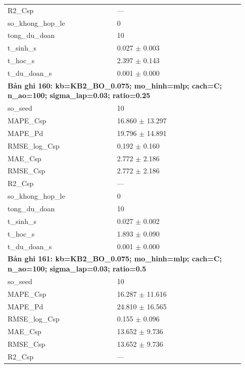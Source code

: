 \begin{longtable}{p{0.43\linewidth}p{0.50\linewidth}}
R2\_\allowbreak Csp & — \\
so\_\allowbreak khong\_\allowbreak hop\_\allowbreak le & 0 \\
tong\_\allowbreak du\_\allowbreak doan & 10 \\
t\_\allowbreak sinh\_\allowbreak s & 0.027 $\pm$ 0.003 \\
t\_\allowbreak hoc\_\allowbreak s & 2.397 $\pm$ 0.143 \\
t\_\allowbreak du\_\allowbreak doan\_\allowbreak s & 0.001 $\pm$ 0.000 \\
\midrule
\multicolumn{2}{p{0.95\linewidth}}{\textbf{Bản ghi 160: kb=KB2\_BO\_0.075; mo\_hinh=mlp; cach=C; n\_ao=100; sigma\_lap=0.03; ratio=0.25}} \\
so\_\allowbreak seed & 10 \\
MAPE\_\allowbreak Csp & 16.860 $\pm$ 13.297 \\
MAPE\_\allowbreak Pd & 19.796 $\pm$ 14.891 \\
RMSE\_\allowbreak log\_\allowbreak Csp & 0.192 $\pm$ 0.160 \\
MAE\_\allowbreak Csp & 2.772 $\pm$ 2.186 \\
RMSE\_\allowbreak Csp & 2.772 $\pm$ 2.186 \\
R2\_\allowbreak Csp & — \\
so\_\allowbreak khong\_\allowbreak hop\_\allowbreak le & 0 \\
tong\_\allowbreak du\_\allowbreak doan & 10 \\
t\_\allowbreak sinh\_\allowbreak s & 0.027 $\pm$ 0.002 \\
t\_\allowbreak hoc\_\allowbreak s & 1.893 $\pm$ 0.090 \\
t\_\allowbreak du\_\allowbreak doan\_\allowbreak s & 0.001 $\pm$ 0.000 \\
\midrule
\multicolumn{2}{p{0.95\linewidth}}{\textbf{Bản ghi 161: kb=KB2\_BO\_0.075; mo\_hinh=mlp; cach=C; n\_ao=100; sigma\_lap=0.03; ratio=0.5}} \\
so\_\allowbreak seed & 10 \\
MAPE\_\allowbreak Csp & 16.287 $\pm$ 11.616 \\
MAPE\_\allowbreak Pd & 24.810 $\pm$ 16.565 \\
RMSE\_\allowbreak log\_\allowbreak Csp & 0.155 $\pm$ 0.096 \\
MAE\_\allowbreak Csp & 13.652 $\pm$ 9.736 \\
RMSE\_\allowbreak Csp & 13.652 $\pm$ 9.736 \\
R2\_\allowbreak Csp & — \\

\end{longtable}
